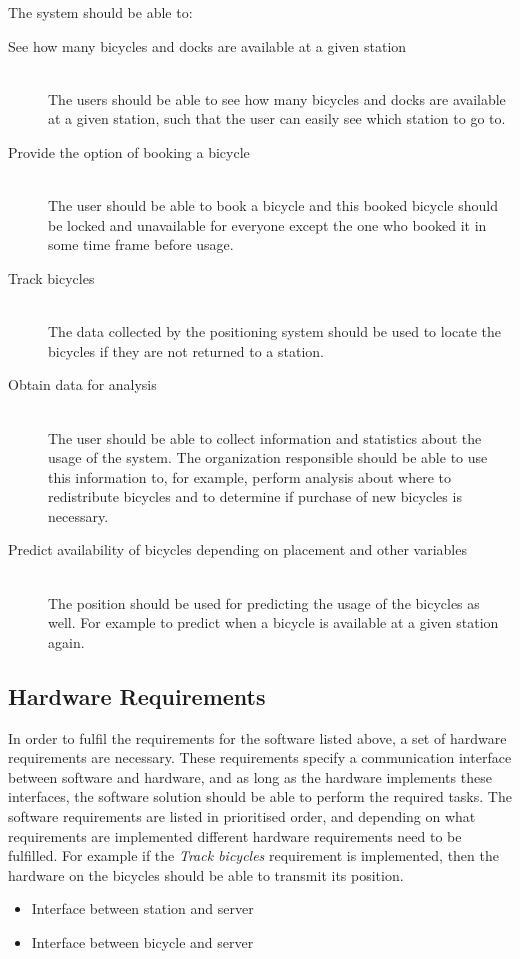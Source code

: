 The system should be able to:
\begin{description}
\item[See how many bicycles and docks are available at a given station] \hfill \\
The users should be able to see how many bicycles and docks are available at a given station, such that the user can easily see which station to go to.
\item[Provide the option of booking a bicycle] \hfill \\
The user should be able to book a bicycle and this booked bicycle should be locked and unavailable for everyone except the one who booked it in some time frame before usage.
\item[Track bicycles] \hfill \\
The data collected by the positioning system should be used to locate the bicycles if they are not returned to a station.
\item[Obtain data for analysis] \hfill \\
The user should be able to collect information and statistics about the usage of the system.
The organization responsible should be able to use this information to, for example, perform analysis about where to redistribute bicycles and to determine if purchase of new bicycles is necessary.
\item[Predict availability of bicycles depending on placement and other variables] \hfill \\
The position should be used for predicting the usage of the bicycles as well. 
For example to predict when a bicycle is available at a given station again.
\end{description}

\subsection{Hardware Requirements}
In order to fulfil the requirements for the software listed above, a set of hardware requirements are necessary.
These requirements specify a communication interface between software and hardware, and as long as the hardware implements these interfaces, the software solution should be able to perform the required tasks.
The software requirements are listed in prioritised order, and depending on what requirements are implemented different hardware requirements need to be fulfilled. 
For example if the \textit{Track bicycles} requirement is implemented, then the hardware on the bicycles should be able to transmit its position.
\begin{itemize}
	\item Interface between station and server
	\item Interface between bicycle and server
\end{itemize}